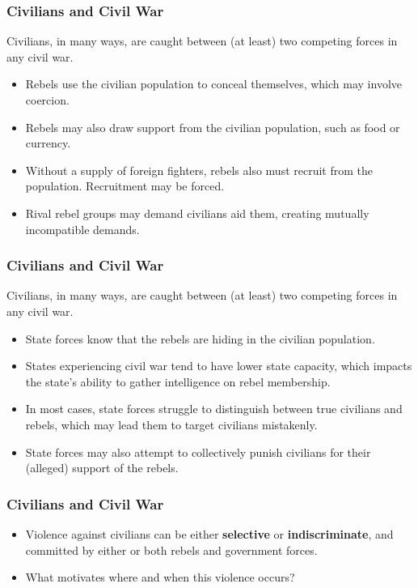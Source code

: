 \documentclass[handout]{beamer}
\begin{document}
\begin{frame} 
	\frametitle{\LARGE{Civilians and Civil War}}
Civilians, in many ways, are caught between (at least) two competing forces in any civil war.
	\begin{itemize}
		\item Rebels use the civilian population to conceal themselves, which may involve coercion. \pause
		\item Rebels may also draw support from the civilian population, such as food or currency. \pause
		\item Without a supply of foreign fighters, rebels also must recruit from the population. Recruitment may be forced. \pause
		\item Rival rebel groups may demand civilians aid them, creating mutually incompatible demands.
	\end{itemize}
\end{frame}

\begin{frame} 
	\frametitle{\LARGE{Civilians and Civil War}}
Civilians, in many ways, are caught between (at least) two competing forces in any civil war.
	\begin{itemize}
		\item State forces know that the rebels are hiding in the civilian population. \pause
		\item States experiencing civil war tend to have lower state capacity, which impacts the state's ability to gather intelligence on rebel membership. \pause
		\item In most cases, state forces struggle to distinguish between true civilians and rebels, which may lead them to target civilians mistakenly. \pause
		\item State forces may also attempt to collectively punish civilians for their (alleged) support of the rebels.
	\end{itemize}
\end{frame}

\begin{frame} 
	\frametitle{\LARGE{Civilians and Civil War}}
	\begin{itemize}
		\item Violence against civilians can be either \textbf{selective} or \textbf{indiscriminate}, and committed by either or both rebels and government forces. \pause
		\item What motivates where and when this violence occurs?		
	\end{itemize}
\end{frame}
\end{document}

